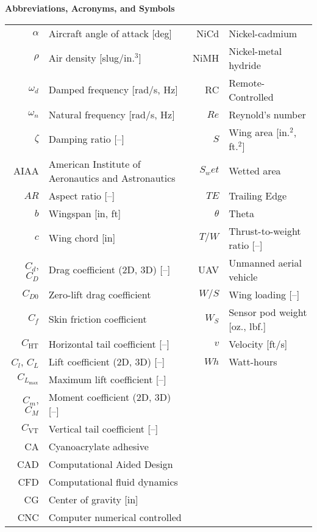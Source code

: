 %
\textbf{Abbreviations, Acronyms, and Symbols}

\begin{tabular}{rl!{\hspace{1em}}rl}
    $\alpha$ & Aircraft angle of attack [deg] & NiCd & Nickel-cadmium\\
    $\rho$ & Air density [slug/in.$^3$] & NiMH & Nickel-metal hydride\\
    $\omega_d$ & Damped frequency [rad/s, Hz] & RC & Remote-Controlled\\
    $\omega_n$ & Natural frequency [rad/s, Hz] &$Re$ & Reynold's number\\
    $\zeta$ & Damping ratio [--] &$S $ & Wing area [in.$^2$, ft.$^2$]\\
    AIAA & American Institute of Aeronautics and Astronautics &$S_wet$ & Wetted area\\
    $AR$ & Aspect ratio [--] & $TE$ & Trailing Edge\\
    $b$ & Wingspan [in, ft] & $\theta$ & Theta\\
    $c$ & Wing chord [in] &$T/W$ & Thrust-to-weight ratio [--]\\
    $C_d$, $C_D$ & Drag coefficient (2D, 3D) [--] &UAV & Unmanned aerial vehicle\\
    $C_{D0}$ & Zero-lift drag coefficient & $W/S$ & Wing loading [--]\\
    $C_f$ & Skin friction coefficient &$W_S$ & Sensor pod weight [oz., lbf.]\\
    $C_\text{HT}$ & Horizontal tail coefficient [--] & $v$ & Velocity [ft/s]\\
    $C_l$, $C_L$ & Lift coefficient (2D, 3D) [--] & $Wh$ & Watt-hours\\
    $C_{L_\text{max}}$ & Maximum lift coefficient [--]\\
    $C_m$, $C_M$ & Moment coefficient (2D, 3D) [--]\\
    $C_\text{VT}$ & Vertical tail coefficient [--]\\
    CA & Cyanoacrylate adhesive\\
    CAD & Computational Aided Design\\
    CFD & Computational fluid dynamics\\
    CG & Center of gravity [in]\\
    CNC & Computer numerical controlled\\

\end{tabular}
